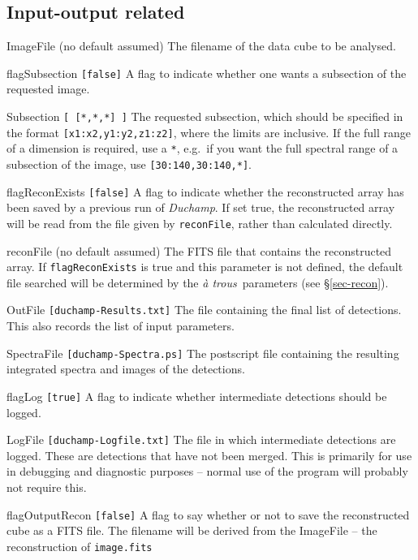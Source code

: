 \documentclass[12pt,a4paper]{article}
\newcommand{\eg}{e.g.\ }
\newcommand{\duchamp}{\emph{Duchamp}}
\newcommand{\atrous}{\textit{{\`a} trous}}
\newcommand{\entrylabel}[1]{\mbox{\textsf{\bf{#1:}}}\hfil}
\newenvironment{entry}
        {\begin{list}{}%
                {\renewcommand{\makelabel}{\entrylabel}%
                        \setlength{\labelwidth}{30mm}%
                        \setlength{\labelsep}{5pt}%
                        \setlength{\itemsep}{2pt}%
                        \setlength{\parsep}{2pt}%
                        \setlength{\leftmargin}{35mm}%
                }%
        }%
{\end{list}}
\begin{document}
\subsection*{Input-output related}
\begin{entry}
\item[ImageFile (no default assumed)] The filename of the
  data cube to be analysed.
\item[flagSubsection \texttt{[false]}] A flag to indicate whether one
  wants a subsection of the requested image.
\item[Subsection \texttt{[ [*,*,*] ]}] The requested subsection, which
  should be specified in the format \texttt{[x1:x2,y1:y2,z1:z2]}, where
  the limits are inclusive. If the full range of a dimension is
  required, use a \texttt{*}, \eg if you want the full spectral range of
  a subsection of the image, use \texttt{[30:140,30:140,*]}.
\item[flagReconExists \texttt{[false]}] A flag to indicate whether the
  reconstructed array has been saved by a previous run of \duchamp. If
  set true, the reconstructed array will be read from the file given by
  \texttt{reconFile}, rather than calculated directly.
\item[reconFile (no default assumed)] The FITS file that contains the
  reconstructed array. If \texttt{flagReconExists} is true and this
  parameter is not defined, the default file searched will be
  determined by the \atrous\ parameters (see \S\ref{sec-recon}).
\item[OutFile \texttt{[duchamp-Results.txt]}] The file containing the
  final list of detections. This also records the list of input
  parameters.
\item[SpectraFile \texttt{[duchamp-Spectra.ps]}] The postscript file
  containing the resulting integrated spectra and images of the
  detections. 
\item[flagLog \texttt{[true]}] A flag to indicate whether intermediate
  detections should be logged.
\item[LogFile \texttt{[duchamp-Logfile.txt]}] The file in which intermediate
  detections are logged. These are detections that have not been
  merged. This is primarily for use in debugging and diagnostic
  purposes -- normal use of the program will probably not require
  this.
\item[flagOutputRecon \texttt{[false]}] A flag to say whether or not to
  save the reconstructed cube as a FITS file. The filename will be
  derived from the ImageFile -- the reconstruction of \texttt{image.fits}

\end{entry}
\end{document}
